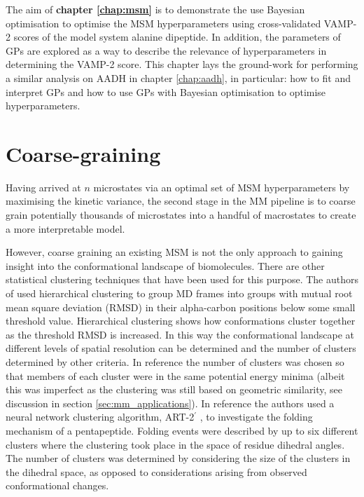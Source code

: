 The aim of \textbf{chapter \ref{chap:msm}} is to demonstrate the use Bayesian optimisation to optimise the MSM hyperparameters using cross-validated VAMP-2 scores of the model system alanine dipeptide. In addition, the parameters of GPs are explored as a way to describe the relevance of hyperparameters in determining the VAMP-2 score. This chapter lays the ground-work for performing a similar analysis on AADH in chapter \ref{chap:aadh}, in particular: how to fit and interpret GPs and how to use GPs with Bayesian optimisation to optimise hyperparameters. 

\section{Coarse-graining}\label{sec:intro_coarse}

Having arrived at $n$ microstates via an optimal set of MSM hyperparameters by maximising the kinetic variance, the second  stage in the MM pipeline is to coarse grain potentially thousands of microstates into a handful of macrostates to create a more interpretable model. 

However, coarse graining an existing MSM is not the only approach to gaining insight into the conformational landscape of biomolecules.  There are other statistical clustering techniques that have been used for this purpose. The authors of \cite{troyerProteinConformationalLandscapes1995} used hierarchical clustering \cite[chapter 10 of]{friedman2001elements} to group MD frames into groups with mutual root mean square deviation (RMSD) in their alpha-carbon positions below some small threshold value. Hierarchical clustering shows how conformations cluster together as the threshold RMSD is increased.  In this way the conformational landscape at different levels of spatial resolution can be determined and the number of clusters determined by other criteria. In reference \cite{troyerProteinConformationalLandscapes1995} the number of clusters was chosen so that members of each cluster were in the same potential energy minima (albeit this was imperfect as the clustering was still based on geometric similarity, see discussion in section \ref{sec:mm_applications}).  In reference \cite{karpen1993statistical} the authors used a neural network clustering algorithm, ART-2$^{\prime}$ \cite{carpenterARTSelforganizationStable1987}, to investigate the folding mechanism of a pentapeptide. Folding events were described by up to six different clusters where the clustering took place in the space of residue dihedral angles. The number of clusters was determined by considering the size of the clusters in the dihedral space, as opposed to considerations arising from observed conformational changes. 


